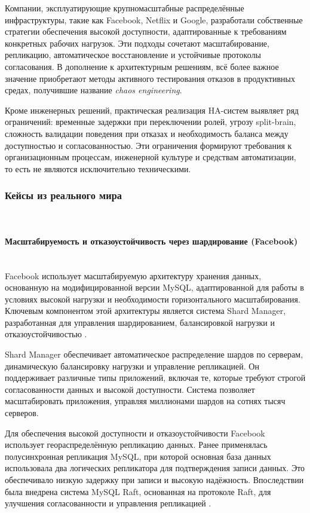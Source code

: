 Компании, эксплуатирующие крупномасштабные распределённые инфраструктуры, такие как Facebook, Netflix и Google, разработали собственные стратегии обеспечения высокой доступности, адаптированные к требованиям конкретных рабочих нагрузок. Эти подходы сочетают масштабирование, репликацию, автоматическое восстановление и устойчивые протоколы согласования. В дополнение к архитектурным решениям, всё более важное значение приобретают методы активного тестирования отказов в продуктивных средах, получившие название \textit{chaos engineering}.

Кроме инженерных решений, практическая реализация HA-систем выявляет ряд ограничений: временные задержки при переключении ролей, угрозу split-brain, сложность валидации поведения при отказах и необходимость баланса между доступностью и согласованностью. Эти ограничения формируют требования к организационным процессам, инженерной культуре и средствам автоматизации, то есть не являются исключительно техническими.

\subsubsection{Кейсы из реального мира} ~\\

\paragraph{Масштабируемость и отказоустойчивость через шардирование (Facebook)} ~\\

Facebook использует масштабируемую архитектуру хранения данных, основанную на модифицированной версии MySQL, адаптированной для работы в условиях высокой нагрузки и необходимости горизонтального масштабирования. Ключевым компонентом этой архитектуры является система Shard Manager, разработанная для управления шардированием, балансировкой нагрузки и отказоустойчивостью \autocite{FBShardManager}.

Shard Manager обеспечивает автоматическое распределение шардов по серверам, динамическую балансировку нагрузки и управление репликацией. Он поддерживает различные типы приложений, включая те, которые требуют строгой согласованности данных и высокой доступности. Система позволяет масштабировать приложения, управляя миллионами шардов на сотнях тысяч серверов.

Для обеспечения высокой доступности и отказоустойчивости Facebook использует геораспределённую репликацию данных. Ранее применялась полусинхронная репликация MySQL, при которой основная база данных использовала два логических репликатора для подтверждения записи данных. Это обеспечивало низкую задержку при записи и высокую надёжность. Впоследствии была внедрена система MySQL Raft, основанная на протоколе Raft, для улучшения согласованности и управления репликацией \autocite{FBRaftMeta}.

